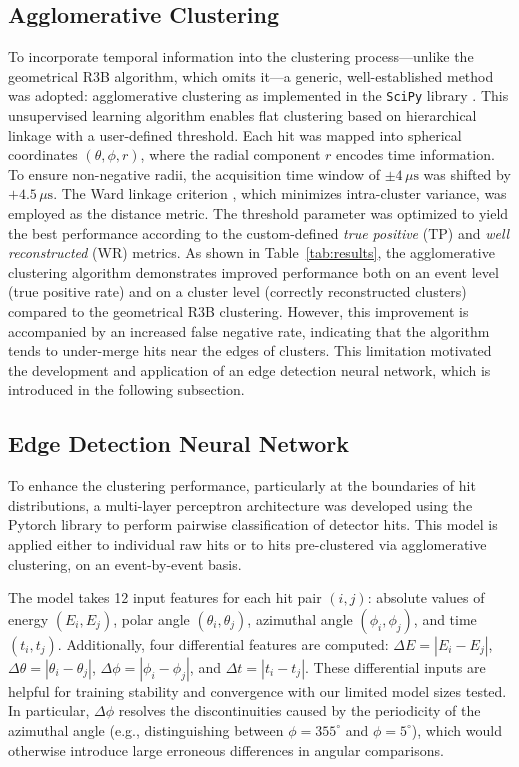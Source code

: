 \documentclass[final,5p,times,twocolumn]{elsarticle}
\begin{document}
\subsection{Agglomerative Clustering}\label{s_sec:agglo}
To incorporate temporal information into the clustering process---unlike the geometrical R3B algorithm, which omits it---a generic, well-established method was adopted: agglomerative clustering \cite{Nielsen2016} as implemented in the \texttt{SciPy} library \cite{virtanen2020scipy}. This unsupervised learning algorithm enables flat clustering based on hierarchical linkage with a user-defined threshold.\newline
Each hit was mapped into spherical coordinates \((\theta, \phi, r)\), where the radial component \(r\) encodes time information. To ensure non-negative radii, the acquisition time window of \(\pm 4\,\mu\mathrm{s}\) was shifted by \(+4.5\,\mu\mathrm{s}\). The Ward linkage criterion \cite{nielsen2016hierarchical}, which minimizes intra-cluster variance, was employed as the distance metric.\newline
The threshold parameter was optimized to yield the best performance according to the custom-defined \textit{true positive} (TP) and \textit{well reconstructed} (WR) metrics.\newline
As shown in Table~\ref{tab:results}, the agglomerative clustering algorithm demonstrates improved performance both on an event level (true positive rate) and on a cluster level (correctly reconstructed clusters) compared to the geometrical R3B clustering. However, this improvement is accompanied by an increased false negative rate, indicating that the algorithm tends to under-merge hits near the edges of clusters. This limitation motivated the development and application of an edge detection neural network, which is introduced in the following subsection.


\subsection{Edge Detection Neural Network}\label{s_sec:edge}
To enhance the clustering performance, particularly at the boundaries of hit distributions, a multi-layer perceptron architecture was developed using the Pytorch library \cite{imambi2021pytorch} to perform pairwise classification of detector hits. This model is applied either to individual raw hits or to hits pre-clustered via agglomerative clustering, on an event-by-event basis.

The model takes 12 input features for each hit pair $(i, j)$: absolute values of energy $(E_i, E_j)$, polar angle $(\theta_i, \theta_j)$, azimuthal angle $(\phi_i, \phi_j)$, and time $(t_i, t_j)$. Additionally, four differential features are computed: $\Delta E = |E_i - E_j|$, $\Delta \theta = |\theta_i - \theta_j|$, $\Delta \phi = |\phi_i - \phi_j|$, and $\Delta t = |t_i - t_j|$. These differential inputs are helpful for training stability and convergence with our limited model sizes tested. In particular, $\Delta \phi$ resolves the discontinuities caused by the periodicity of the azimuthal angle (e.g., distinguishing between $\phi = 355^\circ$ and $\phi = 5^\circ$), which would otherwise introduce large erroneous differences in angular comparisons.
\end{document}
